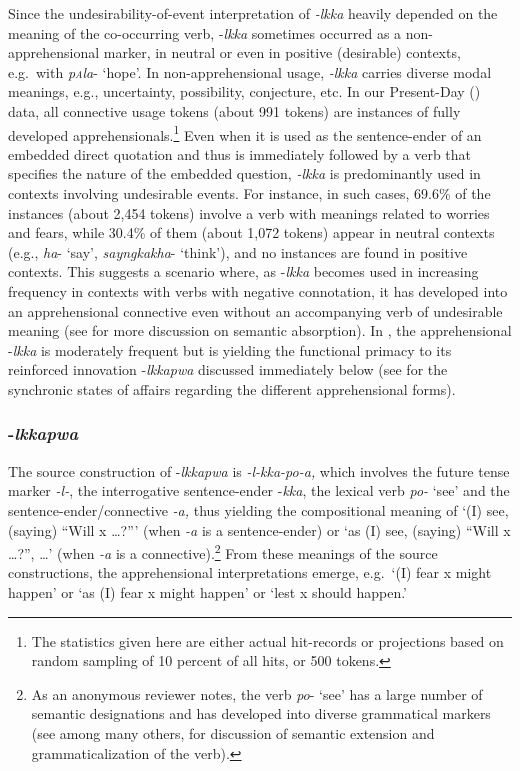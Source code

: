 \documentclass[output=paper,colorlinks,citecolor=brown]{langscibook}
\begin{document}
Since the undesirability-of-event interpretation of \textit{-lkka} heavily depended on the meaning of the co-occurring verb, \nobreakdash-\textit{lkka} sometimes occurred as a non-apprehensional marker, in neutral or even in positive (desirable) contexts, e.g.\  with \textit{p\textsc{a}la}- `hope'. In non-apprehensional usage, \textit{-lkka} carries diverse modal meanings, e.g., uncertainty, possibility, conjecture, etc. In our Present-Day  () data, all connective usage tokens (about 991 tokens) are instances of fully developed apprehensionals.\footnote{The statistics given here are either actual hit-records or projections based on random sampling of 10 percent of all hits, or 500 tokens.} Even when it is used as the sentence-ender of an embedded direct quotation and thus is immediately followed by a verb that specifies the nature of the embedded question, \textit{-lkka} is predominantly used in contexts involving undesirable events. For instance, in such cases, 69.6\% of the instances (about 2,454 tokens) involve a verb with meanings related to worries and fears, while 30.4\% of them (about 1,072 tokens) appear in neutral contexts (e.g., \textit{ha}- `say', \textit{sayngkakha}- `think'), and no instances are found in positive contexts. This suggests a scenario where, as \nobreakdash-\textit{lkka} becomes used in increasing frequency in contexts with verbs with negative connotation, it has developed into an apprehensional connective even without an accompanying verb of undesirable meaning (see  for more discussion on semantic absorption). In , the apprehensional \nobreakdash-\textit{lkka} is moderately frequent but is yielding the functional primacy to its reinforced innovation \nobreakdash-\textit{lkkapwa} discussed immediately below (see  for the synchronic states of affairs regarding the different apprehensional forms).

\subsubsection{-\textit{lkkapwa}} 
The source construction of \nobreakdash-\textit{lkkapwa} is \textit{-l-kka-po-a,} which involves the future tense marker \textit{-l-}, the interrogative sentence-ender \nobreakdash-\textit{kka}, the lexical verb \textit{po-} `see' and the sentence-ender/connective \textit{-a,} thus yielding the compositional meaning of `(I) see, (saying) ``Will x …?''' (when \textit{-a} is a sentence-ender) or `as (I) see, (saying) ``Will x …?'',  …' (when \textit{-a} is a connective).\footnote{As an anonymous reviewer notes, the verb \textit{po}- `see' has a large number of semantic designations and has developed into diverse grammatical markers (see \citealt{Rhee2019, Rhee2020, Rhee2021b, Rhee2021a} among many others, for discussion of semantic extension and grammaticalization of the verb).} From these meanings of the source constructions, the apprehensional interpretations emerge, e.g.\  `(I) fear x might happen' or `as (I) fear x might happen' or `lest x should happen.'
\end{document}
